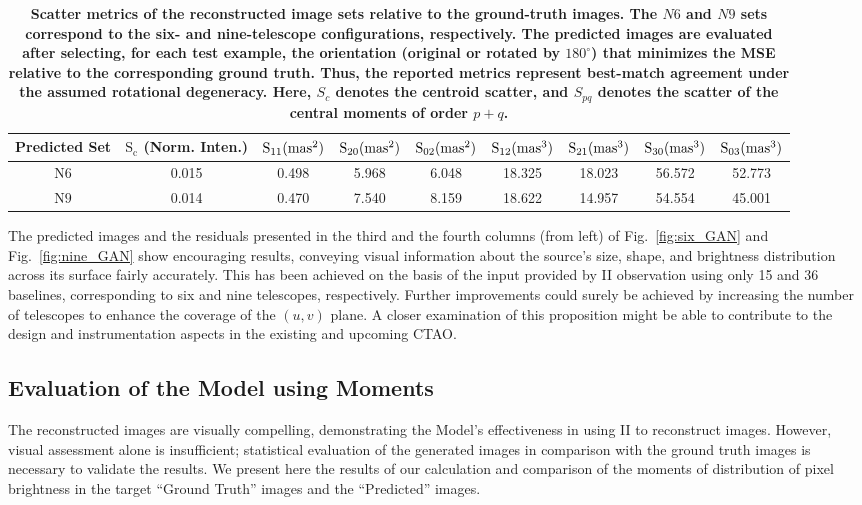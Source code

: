 \begin{table}
	\centering
	\caption{{\bf Scatter metrics of the reconstructed image sets relative to the ground-truth images. The $N6$ and $N9$ sets correspond to the six- and nine-telescope configurations, respectively. The predicted images are evaluated after selecting, for each test example, the orientation (original or rotated by $180^\circ$) that minimizes the MSE relative to the corresponding ground truth. Thus, the reported metrics represent best-match agreement under the assumed rotational degeneracy. Here, $S_c$ denotes the centroid scatter, and $S_{pq}$ denotes the scatter of the central moments of order $p+q$.}}
	\label{tab:mom}
	\begin{tabular}{ccccccccc}
		\toprule
		Predicted Set & $\mathrm{S}_\mathrm{c}$ (Norm. Inten.) & $\mathrm{S}_{11} \rm (mas^{2})$ & $\mathrm{S}_{20} \rm (mas^{2})$ & $\mathrm{S}_{02} \rm (mas^{2})$ & $\mathrm{S}_{12} \rm (mas^{3})$ & $\mathrm{S}_{21} \rm (mas^{3})$ & $\mathrm{S}_{30} \rm (mas^{3})$ & $\mathrm{S}_{03} \rm (mas^{3})$ \\
		\midrule
		$\mathrm{N6}$ & 0.015 & 0.498 & 5.968 & 6.048 & 18.325 & 18.023 & 56.572 & 52.773 \\
		$\mathrm{N9}$ & 0.014 & 0.470 & 7.540 & 8.159 & 18.622 & 14.957 & 54.554 & 45.001 \\
		\bottomrule
	\end{tabular}
\end{table}

The predicted images and the residuals presented in the third and the fourth columns (from left) of Fig.~\ref{fig:six_GAN} and Fig.~\ref{fig:nine_GAN} show encouraging results, conveying visual information about the source's size, shape, and brightness distribution across its surface fairly accurately. This has been achieved on the basis of the input provided by II observation using only 15 and 36 baselines, corresponding to six and nine telescopes, respectively.  Further improvements could surely be achieved by increasing the number of telescopes to enhance the coverage of the $(u, v)$ plane. A closer examination of this proposition might be able to contribute to the design and instrumentation aspects in the existing and upcoming CTAO.

\subsection{Evaluation of the Model using Moments}
The reconstructed images are visually compelling, demonstrating the Model's effectiveness in using II to reconstruct images. However, visual assessment alone is insufficient; statistical evaluation of the generated images in comparison with the ground truth images is necessary to validate the results. We present here the results of our calculation and comparison of the moments of distribution of pixel brightness in the target ``Ground Truth'' images and the ``Predicted'' images.

